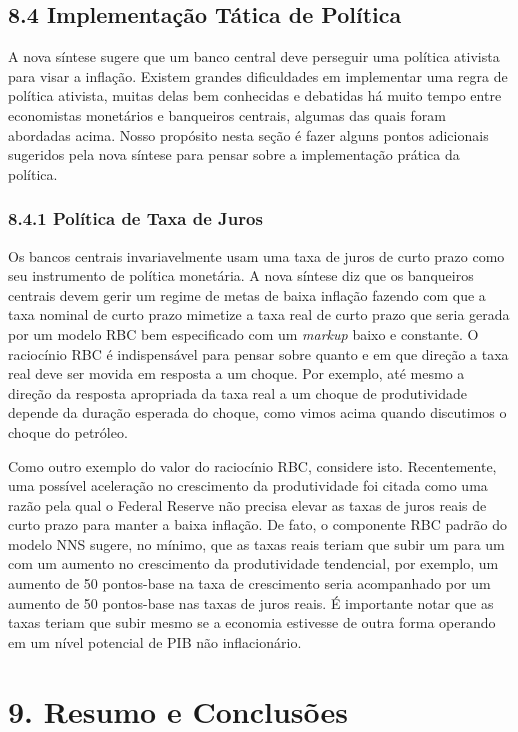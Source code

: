 \documentclass[12pt]{article}
\begin{document}
\subsection{8.4 Implementação Tática de Política}

A nova síntese sugere que um banco central deve perseguir uma política ativista para visar a inflação. Existem grandes dificuldades em implementar uma regra de política ativista, muitas delas bem conhecidas e debatidas há muito tempo entre economistas monetários e banqueiros centrais, algumas das quais foram abordadas acima. Nosso propósito nesta seção é fazer alguns pontos adicionais sugeridos pela nova síntese para pensar sobre a implementação prática da política.

\subsubsection{8.4.1 Política de Taxa de Juros} Os bancos centrais invariavelmente usam uma taxa de juros de curto prazo como seu instrumento de política monetária. A nova síntese diz que os banqueiros centrais devem gerir um regime de metas de baixa inflação fazendo com que a taxa nominal de curto prazo mimetize a taxa real de curto prazo que seria gerada por um modelo RBC bem especificado com um \textit{markup} baixo e constante. O raciocínio RBC é indispensável para pensar sobre quanto e em que direção a taxa real deve ser movida em resposta a um choque. Por exemplo, até mesmo a direção da resposta apropriada da taxa real a um choque de produtividade depende da duração esperada do choque, como vimos acima quando discutimos o choque do petróleo.

Como outro exemplo do valor do raciocínio RBC, considere isto. Recentemente, uma possível aceleração no crescimento da produtividade foi citada como uma razão pela qual o Federal Reserve não precisa elevar as taxas de juros reais de curto prazo para manter a baixa inflação. De fato, o componente RBC padrão do modelo NNS sugere, no mínimo, que as taxas reais teriam que subir um para um com um aumento no crescimento da produtividade tendencial, por exemplo, um aumento de 50 pontos-base na taxa de crescimento seria acompanhado por um aumento de 50 pontos-base nas taxas de juros reais. É importante notar que as taxas teriam que subir mesmo se a economia estivesse de outra forma operando em um nível potencial de PIB não inflacionário.

\section{9. Resumo e Conclusões}
\end{document}
